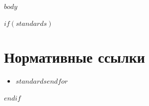 \documentclass[14pt,a4paper]{extarticle}
\begin{document}
\makeTitlePage

\mainpagestyle
\tableofcontents
\newpage

$body$

$if(standards)$
\newpage
\section*{Нормативные ссылки}
\begin{itemize}
$for(standards)$\item $standards$$endfor$
\end{itemize}
$endif$
\end{document}
